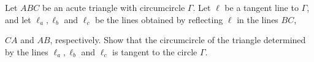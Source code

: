 Let 
$ABC$
 be an acute triangle with circumcircle 
$\Gamma$.
 Let 
$\ell$
 be a tangent line to 
$\Gamma$, 
 and let 
$\ell_a, \ell_b$
 and 
$\ell_c$
 be the lines obtained by reflecting 
$\ell$
 in the lines 
$BC$, 
 
$CA$
 and 
$AB$, 
 respectively. Show that the circumcircle of the triangle determined by the lines 
$\ell_a, \ell_b$
 and 
$\ell_c$
 is tangent to the circle 
$\Gamma$.
